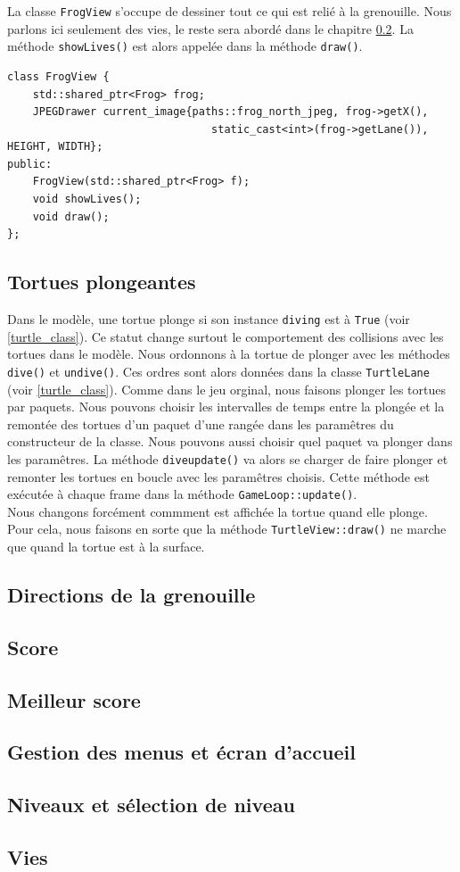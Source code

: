 \documentclass[a4paper, 12pt]{article}
\begin{document}
La classe \texttt{FrogView} s'occupe de dessiner tout ce qui est relié à la grenouille. Nous parlons ici seulement des vies, le reste sera abordé dans le chapitre \ref{frogview}. La méthode \texttt{showLives()} est alors appelée dans la méthode \texttt{draw()}. \\

\begin{lstlisting}
class FrogView {    
    std::shared_ptr<Frog> frog;
    JPEGDrawer current_image{paths::frog_north_jpeg, frog->getX(),
                                static_cast<int>(frog->getLane()), HEIGHT, WIDTH};
public:
    FrogView(std::shared_ptr<Frog> f);
    void showLives();
    void draw();
};
\end{lstlisting}

\subsection{Tortues plongeantes} \label{diving_turtles}

Dans le modèle, une tortue plonge si son instance \texttt{diving} est à \texttt{True} (voir \ref{turtle_class}). Ce statut change surtout le comportement des collisions avec les tortues dans le modèle. Nous ordonnons à la tortue de plonger avec les méthodes \texttt{dive()} et \texttt{undive()}. Ces ordres sont alors données dans la classe \texttt{TurtleLane} (voir \ref{turtle_class}). Comme dans le jeu orginal, nous faisons plonger les tortues par paquets. Nous pouvons choisir les intervalles de temps entre la plongée et la remontée des tortues d'un paquet d'une rangée dans les paramêtres du constructeur de la classe. Nous pouvons aussi choisir quel paquet va plonger dans les paramêtres. La méthode \texttt{dive\textunderscore update()} va alors se charger de faire plonger et remonter les tortues en boucle avec les paramêtres choisis. Cette méthode est exécutée à chaque frame dans la méthode \texttt{GameLoop::update()}. \\

Nous changons forcément commment est affichée la tortue quand elle plonge. Pour cela, nous faisons en sorte que la méthode \texttt{TurtleView::draw()} ne marche que quand la tortue est à la surface.

\subsection{Directions de la grenouille} \label{frogview}

\subsection{Score}

\subsection{Meilleur score}

\subsection{Gestion des menus et écran d'accueil}

\subsection{Niveaux et sélection de niveau}

\subsection{Vies}
\end{document}
